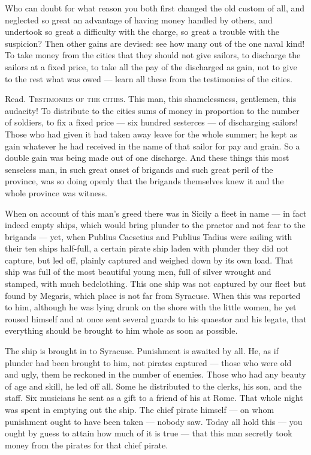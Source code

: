  Who can doubt for what reason you both first changed the old custom of all, and neglected so great an advantage of having money handled by others, and undertook so great a difficulty with the charge, so great a trouble with the suspicion? Then other gains are devised: see how many out of the one naval kind! To take money from the cities that they should not give sailors, to discharge the sailors at a fixed price, to take all the pay of the discharged as gain, not to give to the rest what was owed --- learn all these from the testimonies of the cities.

 Read. \textsc{Testimonies of the cities}. This man, this shamelessness, gentlemen, this audacity! To distribute to the cities sums of money in proportion to the number of soldiers, to fix a fixed price --- six hundred sesterces --- of discharging sailors! Those who had given it had taken away leave for the whole summer; he kept as gain whatever he had received in the name of that sailor for pay and grain. So a double gain was being made out of one discharge. And these things this most senseless man, in such great onset of brigands and such great peril of the province, was so doing openly that the brigands themselves knew it and the whole province was witness.

 When on account of this man's greed there was in Sicily a fleet in name --- in fact indeed empty ships, which would bring plunder to the praetor and not fear to the brigands --- yet, when Publius Caesetius and Publius Tadius were sailing with their ten ships half-full, a certain pirate ship laden with plunder they did not capture, but led off, plainly captured and weighed down by its own load. That ship was full of the most beautiful young men, full of silver wrought and stamped, with much bedclothing. This one ship was not captured by our fleet but found by Megaris, which place is not far from Syracuse. When this was reported to him, although he was lying drunk on the shore with the little women, he yet roused himself and at once sent several guards to his quaestor and his legate, that everything should be brought to him whole as soon as possible.

 The ship is brought in to Syracuse. Punishment is awaited by all. He, as if plunder had been brought to him, not pirates captured --- those who were old and ugly, them he reckoned in the number of enemies. Those who had any beauty of age and skill, he led off all. Some he distributed to the clerks, his son, and the staff. Six musicians he sent as a gift to a friend of his at Rome. That whole night was spent in emptying out the ship. The chief pirate himself --- on whom punishment ought to have been taken --- nobody saw. Today all hold this --- you ought by guess to attain how much of it is true --- that this man secretly took money from the pirates for that chief pirate.

